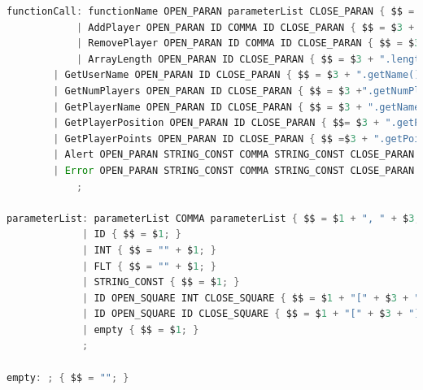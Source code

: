 \documentclass[12pt]{report}
\begin{document}
\begin{singlespace}
\begin{lstlisting}[language=Java,label=some-code,caption={flood$\_$grammar.y}]
functionCall: functionName OPEN_PARAN parameterList CLOSE_PARAN { $$ = $1 + "(" + $3 + ")";  semantics.assignmentCheckFunction($1, yyline);}
            | AddPlayer OPEN_PARAN ID COMMA ID CLOSE_PARAN { $$ = $3 + ".addPlayer(" + $5 + ")" ; semantics.checkIDagainstType($3,"User", yyline);semantics.checkIDagainstType($5,"Player", yyline);}
            | RemovePlayer OPEN_PARAN ID COMMA ID CLOSE_PARAN { $$ = $3 + ".removePlayer(" + $5 + ")" ; semantics.checkIDagainstType($3,"User", yyline);semantics.checkIDagainstType($5,"Player", yyline); semantics.assignmentCheckLeftIsOfType("void", yyline); }
            | ArrayLength OPEN_PARAN ID CLOSE_PARAN { $$ = $3 + ".length"; semantics.checkArrayType($3,yyline); semantics.assignmentCheckLeftIsOfType("int", yyline); }
	    | GetUserName OPEN_PARAN ID CLOSE_PARAN { $$ = $3 + ".getName()"; semantics.checkIDagainstType($3,"User", yyline); semantics.assignmentCheckLeftIsOfType("String", yyline); }
	    | GetNumPlayers OPEN_PARAN ID CLOSE_PARAN { $$ = $3 +".getNumPlayers()";semantics.checkIDagainstType($3,"User", yyline); semantics.assignmentCheckLeftIsOfType("int", yyline); }
	    | GetPlayerName OPEN_PARAN ID CLOSE_PARAN { $$ = $3 + ".getName()";semantics.checkIDagainstType($3,"Player", yyline); semantics.assignmentCheckLeftIsOfType("String", yyline); }
	    | GetPlayerPosition OPEN_PARAN ID CLOSE_PARAN { $$= $3 + ".getPosition()";semantics.checkIDagainstType($3,"Player", yyline); semantics.assignmentCheckLeftIsOfType("String", yyline); }
	    | GetPlayerPoints OPEN_PARAN ID CLOSE_PARAN { $$ =$3 + ".getPoints()";semantics.checkIDagainstType($3,"Player", yyline); semantics.assignmentCheckLeftIsOfType("float", yyline); }
	    | Alert OPEN_PARAN STRING_CONST COMMA STRING_CONST CLOSE_PARAN {$$ ="GUI.alert("+$3+","+$5+")"; semantics.assignmentCheckLeftIsOfType("void", yyline);}
	    | Error OPEN_PARAN STRING_CONST COMMA STRING_CONST CLOSE_PARAN {$$ ="GUI.error("+$3+","+$5+")"; semantics.assignmentCheckLeftIsOfType("void", yyline);}
            ;

parameterList: parameterList COMMA parameterList { $$ = $1 + ", " + $3; }
             | ID { $$ = $1; }
             | INT { $$ = "" + $1; }
             | FLT { $$ = "" + $1; }
             | STRING_CONST { $$ = $1; }
             | ID OPEN_SQUARE INT CLOSE_SQUARE { $$ = $1 + "[" + $3 + "]"; }
             | ID OPEN_SQUARE ID CLOSE_SQUARE { $$ = $1 + "[" + $3 + "]"; semantics.checkIndex($3, yyline);}
             | empty { $$ = $1; }
             ;

empty: ; { $$ = ""; }


\end{lstlisting}
\end{singlespace}
\end{document}
